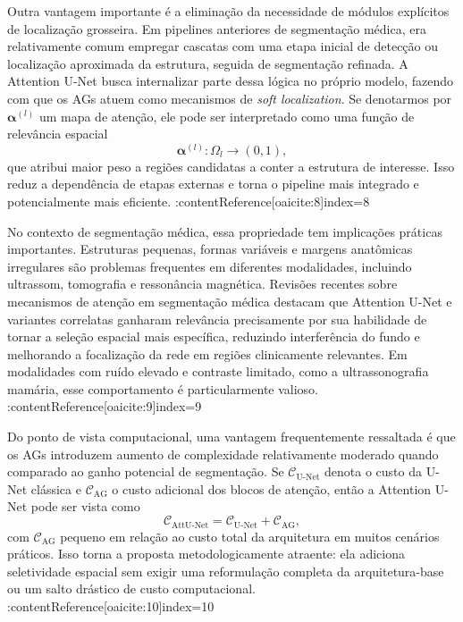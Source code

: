 \documentclass[tcc,capa]{texufpel}
\begin{document}
Outra vantagem importante é a eliminação da necessidade de módulos explícitos de localização grosseira. Em pipelines anteriores de segmentação médica, era relativamente comum empregar cascatas com uma etapa inicial de detecção ou localização aproximada da estrutura, seguida de segmentação refinada. A Attention U-Net busca internalizar parte dessa lógica no próprio modelo, fazendo com que os AGs atuem como mecanismos de \textit{soft localization}. Se denotarmos por \(\boldsymbol{\alpha}^{(l)}\) um mapa de atenção, ele pode ser interpretado como uma função de relevância espacial
\begin{equation}
	\boldsymbol{\alpha}^{(l)} : \Omega_l \rightarrow (0,1),
\end{equation}
que atribui maior peso a regiões candidatas a conter a estrutura de interesse. Isso reduz a dependência de etapas externas e torna o pipeline mais integrado e potencialmente mais eficiente. :contentReference[oaicite:8]{index=8}

No contexto de segmentação médica, essa propriedade tem implicações práticas importantes. Estruturas pequenas, formas variáveis e margens anatômicas irregulares são problemas frequentes em diferentes modalidades, incluindo ultrassom, tomografia e ressonância magnética. Revisões recentes sobre mecanismos de atenção em segmentação médica destacam que Attention U-Net e variantes correlatas ganharam relevância precisamente por sua habilidade de tornar a seleção espacial mais específica, reduzindo interferência do fundo e melhorando a focalização da rede em regiões clinicamente relevantes. Em modalidades com ruído elevado e contraste limitado, como a ultrassonografia mamária, esse comportamento é particularmente valioso. :contentReference[oaicite:9]{index=9}

Do ponto de vista computacional, uma vantagem frequentemente ressaltada é que os AGs introduzem aumento de complexidade relativamente moderado quando comparado ao ganho potencial de segmentação. Se \(\mathcal{C}_{\text{U-Net}}\) denota o custo da U-Net clássica e \(\mathcal{C}_{\text{AG}}\) o custo adicional dos blocos de atenção, então a Attention U-Net pode ser vista como
\begin{equation}
	\mathcal{C}_{\text{AttU-Net}} = \mathcal{C}_{\text{U-Net}} + \mathcal{C}_{\text{AG}},
\end{equation}
com \(\mathcal{C}_{\text{AG}}\) pequeno em relação ao custo total da arquitetura em muitos cenários práticos. Isso torna a proposta metodologicamente atraente: ela adiciona seletividade espacial sem exigir uma reformulação completa da arquitetura-base ou um salto drástico de custo computacional. :contentReference[oaicite:10]{index=10}
\end{document}
